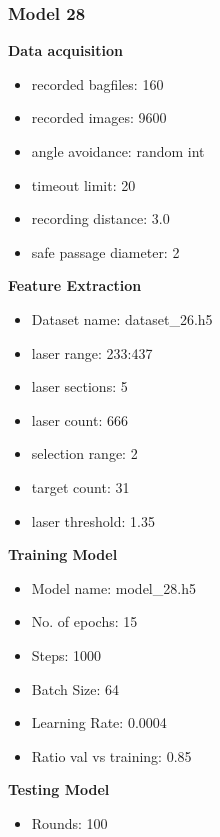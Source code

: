 \subsubsection{Model 28\label{model_28} }
\begin{multicols}{2}\textbf{Data acquisition}
\begin{itemize}
\setlength\itemsep{0.1em}
\item recorded bagfiles: 160
\item recorded images: 9600
\item angle avoidance: random int
\item timeout limit: 20
\item recording distance: 3.0
\item safe passage diameter: 2
\end{itemize}
\textbf{Feature Extraction}
\begin{itemize}
\setlength\itemsep{0.1em}
\item Dataset name: dataset\_26.h5
\item  laser range: 233:437
\item  laser sections: 5
\item  laser count: 666
\item  selection range: 2
\item  target count: 31
\item  laser threshold: 1.35
\end{itemize}
\columnbreak\textbf{Training Model}
\begin{itemize}
\setlength\itemsep{0.1em}
\item  Model name: model\_28.h5
\item  No. of epochs: 15
\item  Steps: 1000
\item  Batch Size: 64
\item  Learning Rate: 0.0004
\item  Ratio val vs training: 0.85
\end{itemize}
\textbf{Testing Model}
\begin{itemize}
\setlength\itemsep{0.1em}
\item Rounds: 100
\newline
\newline
\newline
\newline
\newline
\newline
\newline
\newline

\end{itemize}
\end{multicols}

